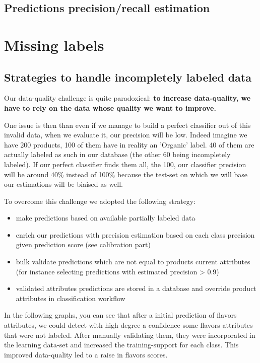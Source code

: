 \subsection{Predictions precision/recall estimation}

\section{Missing labels}


\subsection{Strategies to handle incompletely labeled data}

Our data-quality challenge is quite paradoxical: \textbf{to increase data-quality, we have to rely on the data whose quality we want to improve.}

One issue is then than even if we manage to build a perfect classifier out of this invalid data, when we evaluate it, our precision will be low. Indeed imagine we have 200 products, 100 of them have in reality an 'Organic' label. 40 of them are actually labeled as such in our database (the other 60 being incompletely labeled). If our perfect classifier finds them all, the 100, our classifier precision will be around 40\% instead of 100\% because the test-set on which we will base our estimations will be biaised as well.

To overcome this challenge we adopted the following strategy:

\begin{itemize}
	\item make predictions based on available partially labeled data
	\item enrich our predictions with precision estimation based on each class precision given prediction score (see calibration part)
	\item bulk validate predictions which are not equal to products current attributes (for instance selecting predictions with estimated precision > 0.9)
	\item validated attributes predictions are stored in a database and override product attributes in classification workflow
\end{itemize}

In the following graphs, you can see that after a initial prediction of flavors attributes, we could detect with high degree a confidence some flavors attributes that were not labeled. After manually validating them, they were incorporated in the learning data-set and increased the training-support for each class. This improved data-quality led to a raise in flavors scores.

